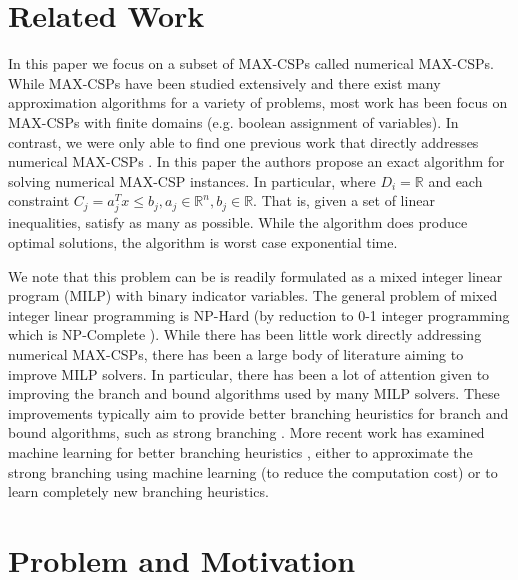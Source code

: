 \documentclass[a4paper]{article}
\begin{document}
\section{Related Work}

In this paper we focus on a subset of MAX-CSPs called numerical MAX-CSPs.  While
MAX-CSPs have been studied extensively and there exist many approximation
algorithms \cite{approx_for_csp_paper} for a variety of problems, most work has
been focus on MAX-CSPs with finite domains (e.g. boolean assignment of
variables).  In contrast, we were only 
able to find one previous work that directly addresses numerical MAX-CSPs
\cite{num_max_csp_paper}.  In this paper the authors propose an exact algorithm
for solving numerical MAX-CSP instances. In particular, where $D_i =
\mathds{R}$ and each constraint $C_j = a_j^Tx \leq b_j, a_j \in \mathds{R}^n,
b_j \in \mathds{R}$.  That is, given a set of linear inequalities, satisfy as
many as possible. While the algorithm does
produce optimal solutions, the algorithm is worst case exponential time.  

We note that this problem can be is readily formulated as a mixed integer
linear program (MILP) with binary indicator variables. The general problem of
mixed integer linear programming is NP-Hard (by reduction to 0-1
integer programming which is NP-Complete \cite{karp_1972}). While there has
been little work directly addressing numerical MAX-CSPs, there has been a
large body of literature aiming to improve MILP solvers. In particular, there
has been a lot of attention given to improving the branch and bound algorithms
used by many MILP solvers. These improvements typically aim to provide better
branching heuristics for branch and bound algorithms, such as strong branching
\cite{strong_branching_paper}. More recent work has examined machine learning
for better branching heuristics \cite{bengio_lodi_prouvost_2021}
\cite{liberto_kadioglu_leo_malitsky_2016}, either to approximate the strong
branching using machine learning (to reduce the computation cost) or to learn
 completely new branching heuristics.

\section{Problem and Motivation}
\end{document}
